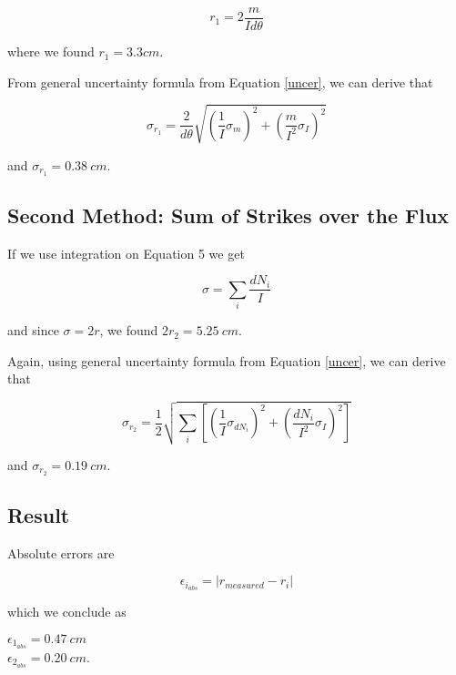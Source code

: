 \documentclass[a4paper]{article}
\begin{document}
\begin{multicols}{2}
\begin{equation}
r_1 = 2\dfrac{m}{Id\theta}
\end{equation}

where we found $r_1 = 3.3 cm$.

From general uncertainty formula from Equation \ref{uncer}, we can derive that

\begin{equation}
\sigma_{r_{1}} = \dfrac{2}{d\theta}\sqrt{(\dfrac{1}{I}\sigma_{m})^2 + (\dfrac{m}{I^2}\sigma_{I})^2}
\end{equation}

and $\sigma_{r_{1}} = 0.38 \ cm$.

\subsection{Second Method: Sum of Strikes over the Flux}

If we use integration on Equation 5 we get

\begin{equation}
\sigma = \sum_i \dfrac{dN_i}{I}
\end{equation}

and since $\sigma = 2r$, we found $2r_2 = 5.25 \ cm$.

Again, using general uncertainty formula from Equation \ref{uncer}, we can derive that

\begin{equation}
\sigma_{r_{2}} = \dfrac{1}{2} \sqrt{\sum_i[(\dfrac{1}{I}\sigma_{dN_i})^2 + (\dfrac{dN_i}{I^2}\sigma_{I})^2]}
\end{equation}

and $\sigma_{r_{2}} = 0.19 \ cm$.

\subsection{Result}

Absolute errors are

\begin{equation}
\epsilon_{i_{abs}} = | r_{measured} - r_i| 
\end{equation}

which we conclude as 

\begin{center}

$\epsilon_{1_{abs}} = 0.47 \ cm$ \\
$\epsilon_{2_{abs}} = 0.20 \ cm$.

\end{center}


\end{multicols}
\end{document}
